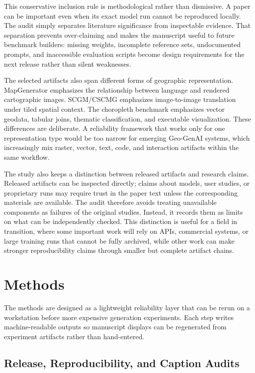 \documentclass[]{interact}
\begin{document}
This conservative inclusion rule is methodological rather than dismissive. A paper can be important even when its exact model run cannot be reproduced locally. The audit simply separates literature significance from inspectable evidence. That separation prevents over-claiming and makes the manuscript useful to future benchmark builders: missing weights, incomplete reference sets, undocumented prompts, and inaccessible evaluation scripts become design requirements for the next release rather than silent weaknesses.

The selected artifacts also span different forms of geographic representation. MapGenerator emphasizes the relationship between language and rendered cartographic images. SCGM/CSCMG emphasizes image-to-image translation under tiled spatial context. The choropleth benchmark emphasizes vector geodata, tabular joins, thematic classification, and executable visualization. These differences are deliberate. A reliability framework that works only for one representation type would be too narrow for emerging Geo-GenAI systems, which increasingly mix raster, vector, text, code, and interaction artifacts within the same workflow.

The study also keeps a distinction between released artifacts and research claims. Released artifacts can be inspected directly; claims about models, user studies, or proprietary runs may require trust in the paper text unless the corresponding materials are available. The audit therefore avoids treating unavailable components as failures of the original studies. Instead, it records them as limits on what can be independently checked. This distinction is useful for a field in transition, where some important work will rely on APIs, commercial systems, or large training runs that cannot be fully archived, while other work can make stronger reproducibility claims through smaller but complete artifact chains.

\section{Methods}

The methods are designed as a lightweight reliability layer that can be rerun on a workstation before more expensive generation experiments. Each step writes machine-readable outputs so manuscript displays can be regenerated from experiment artifacts rather than hand-entered.

\subsection{Release, Reproducibility, and Caption Audits}
\end{document}
